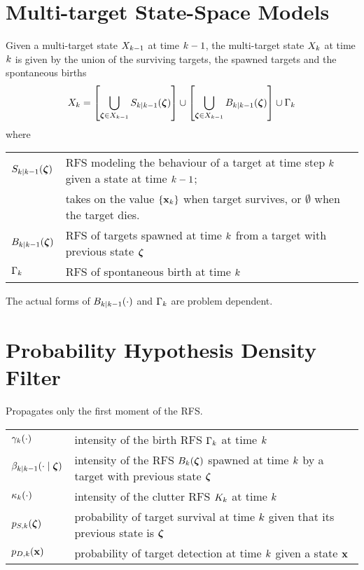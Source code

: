 \documentclass[a4paper,10pt]{scrreprt}
\theoremstyle{theorem}
\theoremstyle{definition}
\begin{document}
\section{Multi-target State-Space Models}
Given a multi-target state \( X_{k-1} \) at time \( k-1 \), the multi-target state \( X_k \) at time \( k \) is given by the union of the surviving targets, the spawned targets and the spontaneous births
\begin{equation}\label{eq:multitarget_dynamics}
	\stRFS_\tind = \bqty{ \bigcup_{\vb{\zeta} \in \stRFS_{\tind-1}} S_{\tind|\tind-1}(\vb{\zeta}) } \cup \bqty{ \bigcup_{\vb{\zeta} \in \stRFS_{\tind-1}} B_{\tind|\tind-1}(\vb{\zeta}) } \cup \Gamma_\tind
\end{equation}
where
\begin{table}[h]
\centering
\begin{tabular}{@{} l l @{}}
	\toprule
	\( S_{\tind|\tind-1}(\vb{\zeta}) \)		& RFS modeling the behaviour of a target at time step \( k \) given a state at time \( k-1 \); \\
											& takes on the value \( \Bqty{\inVar_\tind} \) when target survives, or \( \emptyset \) when the target dies. \\
	\( B_{\tind|\tind-1}(\vb{\zeta}) \)		& RFS of targets spawned at time \( k \) from a target with previous state \( \vb{\zeta} \) \\
	\( \Gamma_k \)						& RFS of spontaneous birth at time \( k \) \\
	\bottomrule
\end{tabular}
\end{table}

The actual forms of \( B_{k|k-1}(\cdot) \) and \( \Gamma_k \) are problem dependent.



\section{Probability Hypothesis Density Filter}
Propagates only the first moment of the RFS.

\begin{table}[h]
\centering
\begin{tabular}{@{} l l @{}}
	\toprule
	\( \gamma_k(\cdot) \)								& intensity of the birth RFS \( \Gamma_k \) at time \( k \) \\
	\( \beta_{\tind|\tind-1}(\cdot \mid \vb{\zeta}) \) 		& intensity of the RFS \( B_\tind(\vb{\zeta}) \) spawned at time \( k \) by a target with previous state \( \vb{\zeta} \) \\
	\( \kappa_k(\cdot) \)								& intensity of the clutter RFS \( K_k \) at time \( k \) \\
	\( p_{S,k}(\vb{\zeta}) \)								& probability of target survival at time \( k \) given that its previous state is \( \vb{\zeta} \) \\
	\( p_{D,k}(\inVar) \)									& probability of target detection at time \( k \) given a state \( \inVar \) \\
	\bottomrule
\end{tabular}
\end{table}
\end{document}

